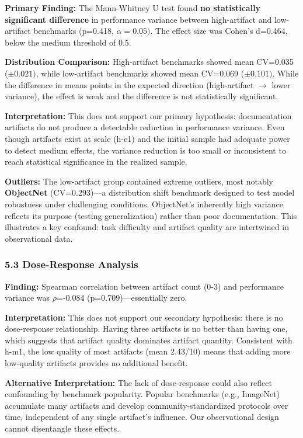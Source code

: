 \textbf{Primary Finding:} The Mann-Whitney U test found \textbf{no statistically significant difference} in performance variance between high-artifact and low-artifact benchmarks (p=0.418, $\alpha =0.05)$. The effect size was Cohen's d=0.464, below the medium threshold of 0.5.

\textbf{Distribution Comparison:} High-artifact benchmarks showed mean CV=0.035 ($\pm 0.021)$, while low-artifact benchmarks showed mean CV=0.069 ($\pm 0.101)$. While the difference in means points in the expected direction (high-artifact $\rightarrow$ lower variance), the effect is weak and the difference is not statistically significant.

\textbf{Interpretation:} This does not support our primary hypothesis: documentation artifacts do not produce a detectable reduction in performance variance. Even though artifacts exist at scale (h-e1) and the initial sample had adequate power to detect medium effects, the variance reduction is too small or inconsistent to reach statistical significance in the realized sample.

\textbf{Outliers:} The low-artifact group contained extreme outliers, most notably \textbf{ObjectNet} (CV=0.293)---a distribution shift benchmark designed to test model robustness under challenging conditions. ObjectNet's inherently high variance reflects its purpose (testing generalization) rather than poor documentation. This illustrates a key confound: task difficulty and artifact quality are intertwined in observational data.

\subsubsection{5.3 Dose-Response Analysis}

\textbf{Finding:} Spearman correlation between artifact count (0-3) and performance variance was $\rho$=-0.084 (p=0.709)---essentially zero.

\textbf{Interpretation:} This does not support our secondary hypothesis: there is no dose-response relationship. Having three artifacts is no better than having one, which suggests that artifact quality dominates artifact quantity. Consistent with h-m1, the low quality of most artifacts (mean 2.43/10) means that adding more low-quality artifacts provides no additional benefit.

\textbf{Alternative Interpretation:} The lack of dose-response could also reflect confounding by benchmark popularity. Popular benchmarks (e.g., ImageNet) accumulate many artifacts and develop community-standardized protocols over time, independent of any single artifact's influence. Our observational design cannot disentangle these effects.


